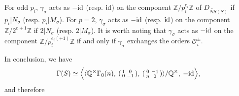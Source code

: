 \documentclass{article}
\theoremstyle{plain}
\theoremstyle{definition}
\theoremstyle{remark}
\newcommand{\Z}{{\mathbb Z}}
\newcommand{\Q}{{\mathbb Q}}
\begin{document}
For odd $p_{i}$, 
$\gamma _{\sigma}$ 
acts as 
$ - {\rm id\/} $ (resp. $ {\rm id\/} $)  
on the component 
${\Z}/p_{i}^{e_{i}}{\Z}$ of $D_{\widetilde{NS}(S)}$ 
if $p_{i}|N_{\sigma}$ (resp. $p_{i}|M_{\sigma}$).  
For $p=2$, 
$\gamma _{\sigma}$ 
acts as 
$ - {\rm id\/} $ (resp. $ {\rm id\/} $)  
on the component 
${\Z}/2^{e+1}{\Z}$  
if $2|N_{\sigma}$ (resp. $2|M_{\sigma}$).  
It is worth noting that  
$\gamma _{\sigma}$ acts as $ - {\rm id\/} $ 
on the component ${\Z}/p_{i}^{e_{i}(+1)}{\Z}$ 
if and only if 
$\gamma _{\sigma}$ exchanges the orders $\mathcal{O}_{i}^{\pm }$. 










In conclusion,  
we have 
\begin{equation*}
\Gamma (S) 
\simeq 
\Bigl\langle 
              \langle 
                       {\Q}^{\times}\Gamma _{0}(n),  \: 
                        (\begin{smallmatrix}
                                        1 & 0 \\
                                        0 & -1 
                           \end{smallmatrix}), \: 
                         (\begin{smallmatrix}
                                        0 & -1 \\
                                        n &  0 
                           \end{smallmatrix})
               \rangle  / {\Q}^{\times},  \: 
       -{\rm id\/}
\Bigr\rangle  , 
\end{equation*}
and 
therefore 
\end{document}
